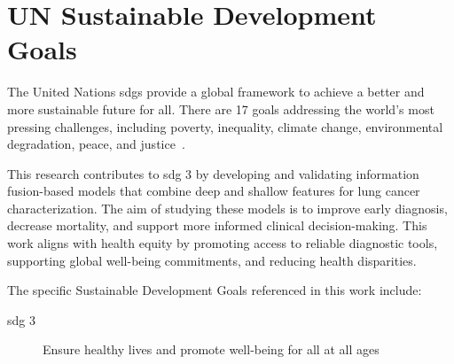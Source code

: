 
\chapter*{UN Sustainable Development Goals} 
\label{chap:UnitedNations}

The United Nations \acp{sdg} provide a global framework to achieve a better and more sustainable future for all. 
There are 17 goals addressing the world's most pressing challenges, including poverty, inequality, climate change, environmental degradation, peace, and justice~\cite{united_nations_17_2015}.

This research contributes to \ac{sdg} 3 by developing and validating information fusion-based models that combine deep and shallow features for lung cancer characterization. The aim of studying these models is to improve early diagnosis, decrease mortality, and support more informed clinical decision-making. This work aligns with health equity by promoting access to reliable diagnostic tools, supporting global well-being commitments, and reducing health disparities.

The specific Sustainable Development Goals referenced in this work include:

\begin{description}
    \item [\ac{sdg} 3] Ensure healthy lives and promote well-being for all at all ages
\end{description}

